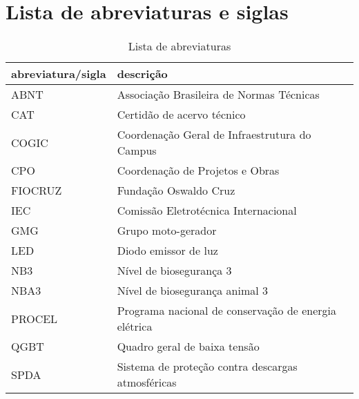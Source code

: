 \section*{Lista de abreviaturas e siglas} \label{section: abbreviations}

\begin{table}[ht]
\centering
\caption{Lista de abreviaturas}
\begin{tabular}[t]
{m{}m{}}
\toprule
\textbf{abreviatura/sigla}&\textbf{descrição}\\
\midrule
ABNT & Associação Brasileira de Normas Técnicas\\
CAT & Certidão de acervo técnico\\
COGIC & Coordenação Geral de Infraestrutura do Campus\\
CPO & Coordenação de Projetos e Obras\\
FIOCRUZ & Fundação Oswaldo Cruz\\
IEC & Comissão Eletrotécnica Internacional\\
GMG & Grupo moto-gerador \\
LED & Diodo emissor de luz \\
NB3 & Nível de biosegurança 3\\
NBA3 & Nível de biosegurança animal 3\\
PROCEL & Programa nacional de conservação de energia elétrica\\
QGBT & Quadro geral de baixa tensão\\
SPDA & Sistema de proteção contra descargas atmosféricas\\
\bottomrule
\end{tabular}
\end{table}